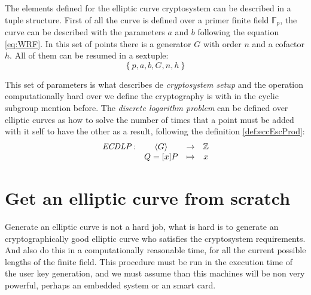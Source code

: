 \documentclass[10pt,a4paper,twoside]{llncs}
\newcommand{\Fp}{\ensuremath{\mathbb{F}_p}}%
\begin{document}
\begin{corollary}
The elements defined for the elliptic curve cryptosystem can be described in a tuple structure. First of all the curve is defined over a primer finite field \Fp, the curve can be described with the parameters $a$ and $b$ following the equation \ref{eq:WRF}. In this set of points there is a generator $G$ with order $n$ and a cofactor $h$. All of them can be resumed in a sextuple:
\begin{equation}\label{eq:setupla}\left\{ p,a,b,G,n,h\right\}\end{equation}
\end{corollary}

This set of parameters is what describes de \emph{cryptosystem setup} and the operation computationally hard over we define the cryptography is with in the cyclic subgroup mention before. The \emph{discrete logarithm problem} can be defined over elliptic curves as how to solve the number of times that a point must be added with it self to have the other as a result, following the definition \ref{def:eccEscProd}:
\begin{equation}\label{ECDLP}
        \begin{array}{cccc}
                \emph{ECDLP}: & \left\langle G\right\rangle & \rightarrow & \mathbb{Z} \\
                \;     & Q=[x]P                           & \mapsto     & x  \\
        \end{array}
\end{equation}

\section{Get an elliptic curve from scratch \label{sec:scratch}}

Generate an elliptic curve is not a hard job, what is hard is to generate an cryptographically good elliptic curve who satisfies the cryptosystem requirements. And also do this in a computationally reasonable time, for all the current possible lengths of the finite field. This procedure must be run in the execution time of the user key generation, and we must assume than this machines will be non very powerful, perhaps an embedded system or an smart card.

\end{document}
